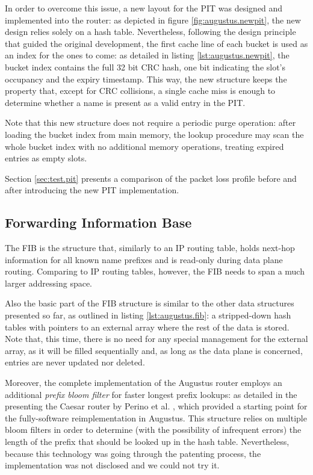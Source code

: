 \documentclass[11pt,a4paper,twoside,titlepage,openany]{book}
\begin{document}
In order to overcome this issue, a new layout for the PIT was designed and implemented into the router: as depicted in figure \ref{fig:augustus.newpit}, the new design relies solely on a hash table. Nevertheless, following the design principle that guided the original development, the first cache line of each bucket is used as an index for the ones to come: as detailed in listing \ref{lst:augustus.newpit}, the bucket index contains the full 32 bit CRC hash, one bit indicating the slot's occupancy and the expiry timestamp. This way, the new structure keeps the property that, except for CRC collisions, a single cache miss is enough to determine whether a name is present as a valid entry in the PIT.

Note that this new structure does not require a periodic purge operation: after loading the bucket index from main memory, the lookup procedure may scan the whole bucket index with no additional memory operations, treating expired entries as empty slots.

Section \ref{sec:test.pit} presents a comparison of the packet loss profile before and after introducing the new PIT implementation.

\subsection{Forwarding Information Base}\label{sec:augustus.fib}
The \gls{FIB} is the structure that, similarly to an IP routing table, holds next-hop information for all known name prefixes and is read-only during data plane routing. Comparing to IP routing tables, however, the \gls{FIB} needs to span a much larger addressing space.

Also the basic part of the FIB structure is similar to the other data structures presented so far, as outlined in listing \ref{lst:augustus.fib}: a stripped-down hash tables with pointers to an external array where the rest of the data is stored. Note that, this time, there is no need for any special management for the external array, as it will be filled sequentially and, as long as the data plane is concerned, entries are never updated nor deleted.

Moreover, the complete implementation of the Augustus router employs an additional \emph{prefix bloom filter} for faster longest prefix lookups: as detailed in the presenting the Caesar router by Perino et al. \cite{caesar}, which provided a starting point for the fully-software reimplementation in Augustus. This structure relies on multiple bloom filters in order to determine (with the possibility of infrequent errors) the length of the prefix that should be looked up in the hash table.
Nevertheless, because this technology was going through the patenting process, the implementation was not disclosed and we could not try it.
\end{document}
